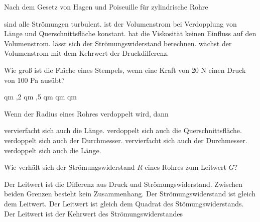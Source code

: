 \documentclass[11pt]{exam}
\begin{document}
\setlength{\voffset}{-0.5in}
\setlength{\headsep}{5pt}

\hspace{2mm}
 \hspace{5mm}
\vspace{4mm}

\begin{questions}

\question Nach dem Gesetz von Hagen und Poiseuille für zylindrische Rohre

\begin{choices}
	\choice sind alle Strömungen turbulent.
	\choice ist der Volumenstrom bei Verdopplung von Länge und Querschnittsfläche konstant.
	\choice hat die Viskosität keinen Einfluss auf den Volumenstrom.
	\choice lässt sich der Strömungswiderstand berechnen.
	\choice wächst der Volumenstrom mit dem Kehrwert der Druckdifferenz.
\end{choices}

\vspace{3mm}\question Wie groß ist die Fläche eines Stempels, wenn eine Kraft von 20 N einen Druck von 100 Pa ausübt?

\begin{choices}
	 qm
	,2 qm
	,5 qm
	 qm
	 qm
\end{choices}

\vspace{3mm}\question Wenn der Radius eines Rohres verdoppelt wird, dann

\begin{choices}
	\choice vervierfacht sich auch die Länge.
	\choice verdoppelt sich auch die Querschnittsfläche.
	\choice verdoppelt sich auch der Durchmesser.
	\choice vervierfacht sich auch der Durchmesser.
	\choice verdoppelt sich auch die Länge.
\end{choices}

\vspace{3mm}\question Wie verhält sich der Strömungswiderstand \(R\) eines Rohres zum Leitwert \(G\)?

\begin{choices}
	\choice Der Leitwert ist die Differenz aus Druck und Strömungswiderstand.
	\choice Zwischen beiden Grenzen besteht kein Zusammenhang.
	\choice Der Strömungswiderstand ist gleich dem Leitwert.
	\choice Der Leitwert ist gleich dem Quadrat des Stömungswiderstands.
	\choice Der Leitwert ist der Kehrwert des Strömungswiderstandes
\end{choices}


\end{questions}
\end{document}
